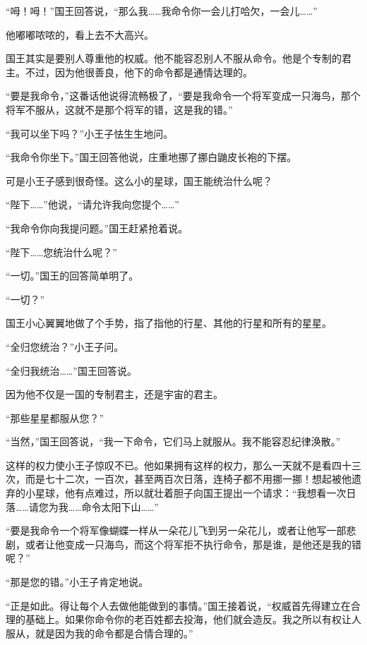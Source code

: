 “呣！呣！”国王回答说，“那么我\ldots{}\ldots{}我命令你一会儿打哈欠，一会儿\ldots{}\ldots{}”

他嘟嘟哝哝的，看上去不大高兴。

国王其实是要别人尊重他的权威。他不能容忍别人不服从命令。他是个专制的君主。不过，因为他很善良，他下的命令都是通情达理的。

“要是我命令，”这番话他说得流畅极了，“要是我命令一个将军变成一只海鸟，那个将军不服从，这就不是那个将军的错，这是我的错。”

“我可以坐下吗？”小王子怯生生地问。

“我命令你坐下。”国王回答他说，庄重地挪了挪白鼬皮长袍的下摆。

可是小王子感到很奇怪。这么小的星球，国王能统治什么呢？

“陛下\ldots{}\ldots{}”他说，“请允许我向您提个\ldots{}\ldots{}”

“我命令你向我提问题。”国王赶紧抢着说。

“陛下\ldots{}\ldots{}您统治什么呢？”

“一切。”国王的回答简单明了。

“一切？”

国王小心翼翼地做了个手势，指了指他的行星、其他的行星和所有的星星。

“全归您统治？”小王子问。

“全归我统治\ldots{}\ldots{}”国王回答说。

因为他不仅是一国的专制君主，还是宇宙的君主。

“那些星星都服从您？”

“当然，”国王回答说，“我一下命令，它们马上就服从。我不能容忍纪律涣散。”

这样的权力使小王子惊叹不已。他如果拥有这样的权力，那么一天就不是看四十三次，而是七十二次，一百次，甚至两百次日落，连椅子都不用挪一挪！想起被他遗弃的小星球，他有点难过，所以就壮着胆子向国王提出一个请求：“我想看一次日落\ldots{}\ldots{}请您为我\ldots{}\ldots{}命令太阳下山\ldots{}\ldots{}”

“要是我命令一个将军像蝴蝶一样从一朵花儿飞到另一朵花儿，或者让他写一部悲剧，或者让他变成一只海鸟，而这个将军拒不执行命令，那是谁，是他还是我的错呢？”

“那是您的错。”小王子肯定地说。

“正是如此。得让每个人去做他能做到的事情。”国王接着说，“权威首先得建立在合理的基础上。如果你命令你的老百姓都去投海，他们就会造反。我之所以有权让人服从，就是因为我的命令都是合情合理的。”

{\startalignment[center]
 \stopalignment}

